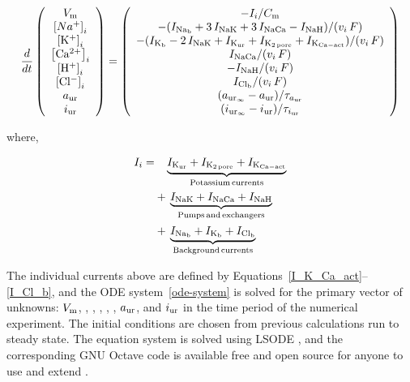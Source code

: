 \begin{equation}
  \frac{d}{dt}
  \left(
    \begin{array}{c}
      V_{\rm m}\\
      \left[Na^{+}\right]_{i}\\
      \left[\rm K^{+}\right]_{i}\\
      \left[\rm Ca^{2+}\right]_{i}\\
      \left[\rm H^{+}\right]_{i}\\
      \left[\rm Cl^{-}\right]_{i}\\
      a_{\rm ur}\\
      i_{\rm ur}\\
    \end{array}
  \right)  = \left(
    \begin{array}{c}
      -I_{i}/{C_{\rm m}}\\
      - (I_{\rm Na_{b}} + 3\, I_{\rm NaK} + 3\, I_{\rm NaCa} - I_{\rm
        NaH})/(v_{i}\, F)\\
      - (I_{\rm K_{b}} - 2\, I_{\rm NaK} + I_{\rm K_{ur}} + I_{\rm
        K_{2\, pore}} + I_{\rm K_{Ca-act}})/(v_{i}\,
      F)\\
        I_{\rm NaCa}/(v_{i}\, F)\\
      - I_{\rm NaH}/(v_{i}\, F)\\
        I_{\rm Cl_{b}}/(v_{i}\, F)\\
      (a_{{\rm ur}_{\infty}} - a_{\rm ur})/\tau_{a_{\rm ur}}\\
      (i_{{\rm ur}_{\infty}} - i_{\rm ur})/\tau_{i_{\rm ur}}\\
    \end{array}
  \right)
  \label{ode-system}
\end{equation}

\noindent where,

\begin{equation*}
    \begin{split}
      I_{i} =
      & \phantom{+\,} \underbrace{I_{\rm K_{ur}} + I_{\rm K_{2\, pore}} + I_{\rm
          K_{Ca-act}}}_{\rm Potassium\, currents}\\
      & +\, \underbrace{I_{\rm NaK} + I_{\rm NaCa} + I_{\rm NaH}}_{\rm
        Pumps\, and\, exchangers}\\
      & +\, \underbrace{I_{\rm Na_b} + I_{\rm K_b} + I_{\rm Cl_b}}_{\rm
        Background\, currents}
    \end{split}
\end{equation*}

The individual currents above are defined by
Equations~\ref{I_K_Ca_act}--\ref{I_Cl_b}, and the ODE
system~\ref{ode-system} is solved for the primary vector of unknowns:
$V_{\rm m}$, \Nai, \Ki, \Cai, \Hi, \Cli, $a_{\rm ur}$, and $i_{\rm
  ur}$ in the time period of the numerical experiment. The initial
conditions are chosen from previous calculations run to steady
state. The equation system is solved using LSODE
\citep{RadhakrishnanHindmarsh1993}, and the corresponding GNU Octave
code is available free and open source for anyone to use and extend
\citep{UNKNOWN}.

